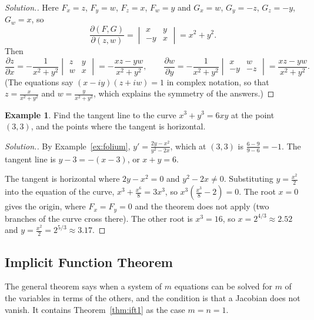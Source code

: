 \documentclass[11pt,a4paper]{article}
\theoremstyle{definition}
\newtheorem{exa}[thm]{Example}
\newenvironment{solution}
  {\renewcommand{\qedsymbol}{}\begin{proof}[\textit{Solution}.]}
  {\end{proof}}
\begin{document}
\begin{solution}
Here $F_x = z$, $F_y = w$, $F_z = x$, $F_w = y$ and $G_x = w$, $G_y = -z$,
$G_z = -y$, $G_w = x$, so
\[\frac{\partial(F,G)}{\partial(z,w)} = \begin{vmatrix} x & y\\ -y &
x\end{vmatrix} = x^2 + y^2 .\]
Then
\[\frac{\partial z}{\partial x} = -\frac{1}{x^2+y^2}\begin{vmatrix} z & y\\ w &
x\end{vmatrix} = -\frac{xz - yw}{x^2 + y^2},\qquad \frac{\partial w}{\partial y} =
-\frac{1}{x^2+y^2}\begin{vmatrix} x & w\\ -y & -z\end{vmatrix} = \frac{xz -
yw}{x^2 + y^2} .\]
(The equations say $(x - iy)(z + iw) = 1$ in complex notation, so that $z = \frac{x}{x^2+y^2}$ and $w = \frac{y}{x^2+y^2}$, which
explains the symmetry of the answers.)
\end{solution}

\begin{exa}
\label{ex:implicittangent}
Find the tangent line to the curve $x^3 + y^3 = 6xy$ at the point $(3,3)$, and the
points where the tangent is horizontal.
\end{exa}

\begin{solution}
By Example~\ref{ex:folium}, $y' = \frac{2y - x^2}{y^2 - 2x}$, which at $(3,3)$ is
$\frac{6 - 9}{9 - 6} = -1$. The tangent line is $y - 3 = -(x - 3)$, or
$x + y = 6$.

The tangent is horizontal where $2y - x^2 = 0$ and $y^2 - 2x\neq 0$. Substituting
$y = \frac{x^2}{2}$ into the equation of the curve,
$x^3 + \frac{x^6}{8} = 3x^3$, so $x^3\left(\frac{x^3}{8} - 2\right) = 0$. The root
$x = 0$ gives the origin, where $F_x = F_y = 0$ and the theorem does not apply
(two branches of the curve cross there). The other root is $x^3 = 16$, so
$x = 2^{4/3}\approx 2.52$ and $y = \frac{x^2}{2} = 2^{5/3}\approx 3.17$.
\end{solution}

{\color[wave]{485}\subsection{Implicit Function Theorem}}

The general theorem says when a system of $m$ equations can be solved for $m$ of
the variables in terms of the others, and the condition is that a Jacobian does
not vanish. It contains Theorem~\ref{thm:ift1} as the case $m = n = 1$.
\end{document}
